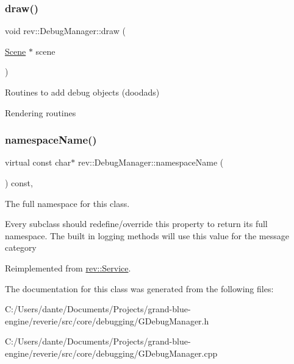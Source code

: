 \subsubsection{\texorpdfstring{draw()}{draw()}}
{\footnotesize\ttfamily void rev\+::\+Debug\+Manager\+::draw (\begin{DoxyParamCaption}\item[{\mbox{\hyperlink{classrev_1_1_scene}{Scene}} $\ast$}]{scene }\end{DoxyParamCaption})}



Routines to add debug objects (doodads) 

Rendering routines \mbox{\label{classrev_1_1_debug_manager_a0f83cdbbd2ed91549fe2ae4fdf8809b6}} 
\subsubsection{\texorpdfstring{namespaceName()}{namespaceName()}}
{\footnotesize\ttfamily virtual const char$\ast$ rev\+::\+Debug\+Manager\+::namespace\+Name (\begin{DoxyParamCaption}{ }\end{DoxyParamCaption}) const\hspace{0.3cm}{\ttfamily [inline]}, {\ttfamily [virtual]}}



The full namespace for this class. 

Every subclass should redefine/override this property to return its full namespace. The built in logging methods will use this value for the message category 

Reimplemented from \mbox{\hyperlink{classrev_1_1_service_a831f5bf8c53584ec830aaee38ea58e7b}{rev\+::\+Service}}.



The documentation for this class was generated from the following files\+:\begin{DoxyCompactItemize}
\item 
C\+:/\+Users/dante/\+Documents/\+Projects/grand-\/blue-\/engine/reverie/src/core/debugging/G\+Debug\+Manager.\+h\item 
C\+:/\+Users/dante/\+Documents/\+Projects/grand-\/blue-\/engine/reverie/src/core/debugging/G\+Debug\+Manager.\+cpp\end{DoxyCompactItemize}
